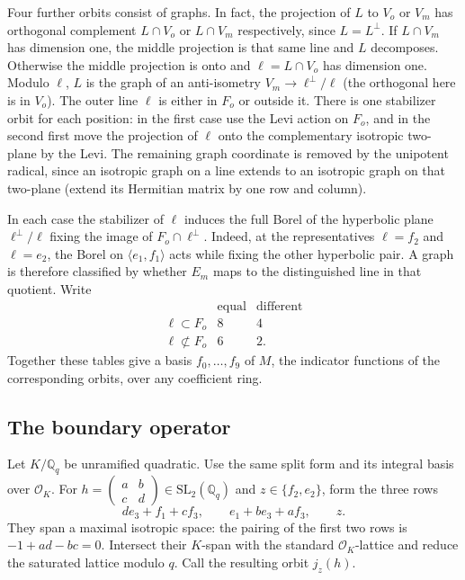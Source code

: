 \documentclass[11pt]{article}
\newcommand{\OO}{\mathcal O}
\begin{document}
Four further orbits consist of graphs. In fact, the projection of $L$
to $V_o$ or $V_m$ has orthogonal complement $L\cap V_o$ or $L\cap V_m$
respectively, since $L=L^\perp$. If $L\cap V_m$ has dimension one,
the middle projection is that same line and $L$ decomposes. Otherwise
the middle projection is onto and $\ell=L\cap V_o$ has dimension one.
Modulo $\ell$, $L$ is the graph of an anti-isometry
$V_m\to\ell^\perp/\ell$ (the orthogonal here is in $V_o$).
The outer line $\ell$ is either in $F_o$ or outside it. There is
one stabilizer orbit for each position: in the first case use the
Levi action on $F_o$, and in the second first move the projection of
$\ell$ onto the complementary isotropic two-plane by the Levi.
The remaining graph coordinate is removed by the unipotent radical,
since an isotropic graph on a line extends to an isotropic graph on
that two-plane (extend its Hermitian matrix by one row and column).

In each case the stabilizer of $\ell$ induces the full Borel of the
hyperbolic plane $\ell^\perp/\ell$ fixing the image of
$F_o\cap\ell^\perp$. Indeed, at the representatives $\ell=f_2$ and
$\ell=e_2$, the Borel on $\langle e_1,f_1\rangle$ acts while fixing
the other hyperbolic pair. A graph is therefore classified by whether
$E_m$ maps to the distinguished line in that quotient. Write
\[
\begin{array}{c|cc}
 &\text{equal}&\text{different}\\\hline
\ell\subset F_o&8&4\\
\ell\not\subset F_o&6&2 .
\end{array}
\]
Together these tables give a basis $f_0,\ldots,f_9$ of $M$, the
indicator functions of the corresponding orbits, over any coefficient
ring.

\subsection{The boundary operator}

Let $K/\mathbb Q_q$ be unramified quadratic. Use the same split form
and its integral basis over $\OO_K$. For
$h=\left(\begin{smallmatrix}a&b\\ c&d\end{smallmatrix}\right)
\in\mathrm{SL}_2(\mathbb Q_q)$ and $z\in\{f_2,e_2\}$, form the three
rows
\begin{equation}\label{rows}
       d e_3+f_1+c f_3,\qquad e_1+b e_3+a f_3,\qquad z .
\end{equation}
They span a maximal isotropic space: the pairing of the first two
rows is $-1+ad-bc=0$. Intersect their $K$-span with the standard
$\OO_K$-lattice and reduce the saturated lattice modulo $q$. Call
the resulting orbit $j_z(h)$.
\end{document}
